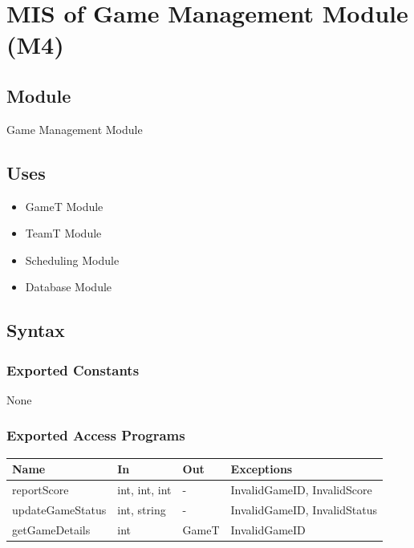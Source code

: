 \documentclass[12pt, titlepage]{article}
\begin{document}
\newpage

\section{MIS of Game Management Module (M4)} \label{GameManagementModule}

\subsection{Module}

Game Management Module

\subsection{Uses}

\begin{itemize}
  \item GameT Module
  \item TeamT Module
  \item Scheduling Module
  \item Database Module
\end{itemize}

\subsection{Syntax}

\subsubsection{Exported Constants}

None

\subsubsection{Exported Access Programs}

\begin{center}
  \begin{tabularx}{\textwidth}{|l|X|X|X|}
    \hline
    \textbf{Name}    & \textbf{In}   & \textbf{Out} & \textbf{Exceptions}          \\
    \hline
    reportScore      & int, int, int & -            & InvalidGameID, InvalidScore  \\
    \hline
    updateGameStatus & int, string   & -            & InvalidGameID, InvalidStatus \\
    \hline
    getGameDetails   & int           & GameT        & InvalidGameID                \\
    \hline
  \end{tabularx}
\end{center}
\end{document}
